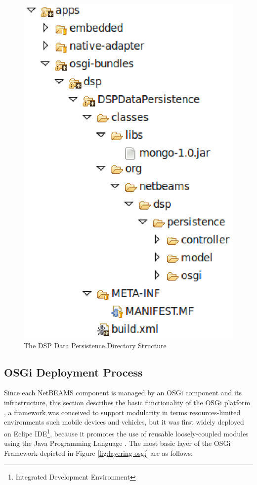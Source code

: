 \begin{figure}[!h]
  \centering
  \includegraphics[scale=0.5]{../diagrams/dsp-data-persistence-dir-checkedout}
  \caption{The DSP Data Persistence Directory Structure}
  \label{fig:dsp-data-persistence-dir-checkedout}
\end{figure}

\subsection{OSGi Deployment Process}

Since each NetBEAMS component is managed by an OSGi component and its
infrastructure, this section describes the basic functionality of the
OSGi platform \cite{osgi}, a framework was conceived to support
modularity in terms resources-limited environments such mobile devices and
vehicles, but it was first widely deployed on Eclipe IDE\footnote{Integrated
Development Environment}, because it promotes the use of reusable
loosely-coupled modules using the Java Programming Language \cite{java}. The
most basic layer of the OSGi Framework depicted in Figure
\ref{fig:layering-osgi} are as follows:

